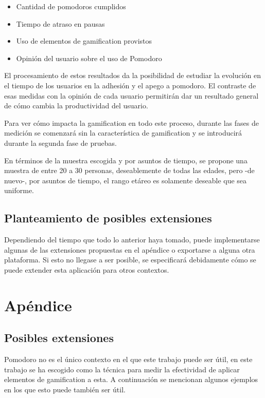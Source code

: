 \documentclass[12pt,letterpaper]{report}
\begin{document}
\begin{itemize}
  \item Cantidad de pomodoros cumplidos
  \item Tiempo de atraso en pausas
  \item Uso de elementos de gamification provistos
  \item Opinión del usuario sobre el uso de Pomodoro
\end{itemize}

El procesamiento de estos resultados da la posibilidad de estudiar la evolución en el tiempo de los usuarios en la
adhesión y el apego a pomodoro. El contraste de esas medidas con la opinión de cada usuario permitirán dar un resultado
general de cómo cambia la productividad del usuario.

Para ver cómo impacta la gamification en todo este proceso, durante las fases de medición se comenzará sin la
característica de gamification y se introducirá durante la segunda fase de pruebas. 

En términos de la muestra escogida y por asuntos de tiempo, se propone una muestra de entre 20 a 30 personas,
deseablemente de todas las edades, pero -de nuevo-, por asuntos de tiempo, el rango etáreo es solamente deseable que sea
uniforme.

\subsection{Planteamiento de posibles extensiones}\label{planteamiento-de-posibles-extensiones}

Dependiendo del tiempo que todo lo anterior haya tomado, puede implementarse algunas de las extensiones propuestas en el
apéndice o exportarse a alguna otra plataforma. Si esto no llegase a ser posible, se especificará debidamente cómo se
puede extender esta aplicación para otros contextos.

\newpage
\section{Apéndice}\label{sec:apendice}

\subsection{Posibles extensiones}\label{subsec:posibles-extensiones}

Pomodoro no es el único contexto en el que este trabajo puede ser útil, en este trabajo se ha escogido como la técnica
para medir la efectividad de aplicar elementos de gamification a esta. A continuación se mencionan algunos ejemplos en
los que esto puede también ser útil.
\end{document}
